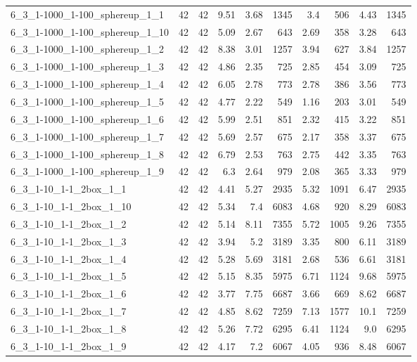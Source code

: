 \begin{center}
\begin{scriptsize}
\begin{longtable}{lrrrrrrrrr}
6\_3\_1-1000\_1-100\_sphereup\_1\_1 & 42 & 42 & 9.51 & 3.68 & 1345 & 3.4 & 506 & 4.43 & 1345\\
6\_3\_1-1000\_1-100\_sphereup\_1\_10 & 42 & 42 & 5.09 & 2.67 & 643 & 2.69 & 358 & 3.28 & 643\\
6\_3\_1-1000\_1-100\_sphereup\_1\_2 & 42 & 42 & 8.38 & 3.01 & 1257 & 3.94 & 627 & 3.84 & 1257\\
6\_3\_1-1000\_1-100\_sphereup\_1\_3 & 42 & 42 & 4.86 & 2.35 & 725 & 2.85 & 454 & 3.09 & 725\\
6\_3\_1-1000\_1-100\_sphereup\_1\_4 & 42 & 42 & 6.05 & 2.78 & 773 & 2.78 & 386 & 3.56 & 773\\
6\_3\_1-1000\_1-100\_sphereup\_1\_5 & 42 & 42 & 4.77 & 2.22 & 549 & 1.16 & 203 & 3.01 & 549\\
6\_3\_1-1000\_1-100\_sphereup\_1\_6 & 42 & 42 & 5.99 & 2.51 & 851 & 2.32 & 415 & 3.22 & 851\\
6\_3\_1-1000\_1-100\_sphereup\_1\_7 & 42 & 42 & 5.69 & 2.57 & 675 & 2.17 & 358 & 3.37 & 675\\
6\_3\_1-1000\_1-100\_sphereup\_1\_8 & 42 & 42 & 6.79 & 2.53 & 763 & 2.75 & 442 & 3.35 & 763\\
6\_3\_1-1000\_1-100\_sphereup\_1\_9 & 42 & 42 & 6.3 & 2.64 & 979 & 2.08 & 365 & 3.33 & 979\\
6\_3\_1-10\_1-1\_2box\_1\_1 & 42 & 42 & 4.41 & 5.27 & 2935 & 5.32 & 1091 & 6.47 & 2935\\
6\_3\_1-10\_1-1\_2box\_1\_10 & 42 & 42 & 5.34 & 7.4 & 6083 & 4.68 & 920 & 8.29 & 6083\\
6\_3\_1-10\_1-1\_2box\_1\_2 & 42 & 42 & 5.14 & 8.11 & 7355 & 5.72 & 1005 & 9.26 & 7355\\
6\_3\_1-10\_1-1\_2box\_1\_3 & 42 & 42 & 3.94 & 5.2 & 3189 & 3.35 & 800 & 6.11 & 3189\\
6\_3\_1-10\_1-1\_2box\_1\_4 & 42 & 42 & 5.28 & 5.69 & 3181 & 2.68 & 536 & 6.61 & 3181\\
6\_3\_1-10\_1-1\_2box\_1\_5 & 42 & 42 & 5.15 & 8.35 & 5975 & 6.71 & 1124 & 9.68 & 5975\\
6\_3\_1-10\_1-1\_2box\_1\_6 & 42 & 42 & 3.77 & 7.75 & 6687 & 3.66 & 669 & 8.62 & 6687\\
6\_3\_1-10\_1-1\_2box\_1\_7 & 42 & 42 & 4.85 & 8.62 & 7259 & 7.13 & 1577 & 10.1 & 7259\\
6\_3\_1-10\_1-1\_2box\_1\_8 & 42 & 42 & 5.26 & 7.72 & 6295 & 6.41 & 1124 & 9.0 & 6295\\
6\_3\_1-10\_1-1\_2box\_1\_9 & 42 & 42 & 4.17 & 7.2 & 6067 & 4.05 & 936 & 8.48 & 6067\\

\end{longtable}
\end{scriptsize}
\end{center}
